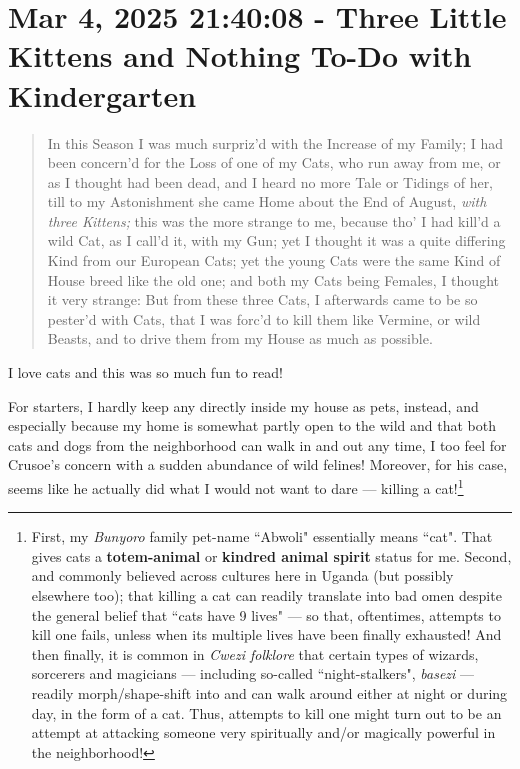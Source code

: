 \documentclass[a4paper]{article}
\begin{document}
\section{Mar 4, 2025 21:40:08 - Three Little Kittens and Nothing To-Do with Kindergarten}
\label{SEC26}



\noindent
\begin{minipage}{1\textwidth}
\vspace{1em}
\begin{quotation}
{\ttfamily


In this Season I was much surpriz’d with the Increase of my Family; I had been concern’d for the Loss of one of my Cats, who run away from me, or as I thought had been dead, and I heard no more Tale or Tidings of her, till to my Astonishment she came Home about the End of August, \textit{with three Kittens;} this was the more strange to me, because tho’ I had kill’d a wild Cat, as I call’d it, with my Gun; yet I thought it was a quite differing Kind from our European Cats; yet the young Cats were the same Kind of House breed like the old one; and both my Cats being Females, I thought it very strange: But from these three Cats, I afterwards came to be so pester’d with Cats, that I was forc’d to kill them like Vermine, or wild Beasts, and to drive them from my House as much as possible.

}
\end{quotation}
\vspace{1em}
\end{minipage}



I love cats and this was so much fun to read! 

For starters, I hardly keep any directly inside my house as pets, instead, and especially because my home is somewhat partly open to the wild and that both cats and dogs from the neighborhood can walk in and out any time, I too feel for Crusoe's concern with a sudden abundance of wild felines! Moreover, for his case, seems like he actually did what I would not want to dare --- killing a cat!\footnote{First, my \textit{Bunyoro} family pet-name ``Abwoli" essentially means ``cat". That gives cats a \textbf{totem-animal} or \textbf{kindred animal spirit} status for me. Second, and commonly believed across cultures here in Uganda (but possibly elsewhere too); that killing a cat can readily translate into bad omen despite the general belief that ``cats have 9 lives" --- so that, oftentimes, attempts to kill one fails, unless when its multiple lives have been finally exhausted! And then finally, it is common in \textit{Cwezi folklore} that certain types of wizards, sorcerers and magicians --- including so-called ``night-stalkers", \textit{basezi} --- readily morph/shape-shift into and can walk around either at night or during day, in the form of a cat. Thus, attempts to kill one might turn out to be an attempt at attacking someone very spiritually and/or magically powerful in the neighborhood!} 
\end{document}
